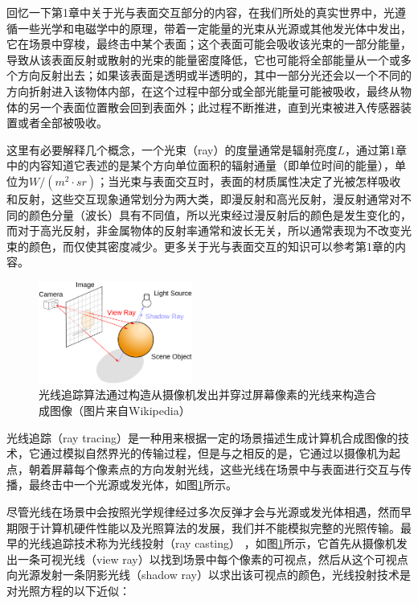 回忆一下第1章中关于光与表面交互部分的内容，在我们所处的真实世界中，光遵循一些光学和电磁学中的原理，带着一定能量的光束从光源或其他发光体中发出，它在场景中穿梭，最终击中某个表面；这个表面可能会吸收该光束的一部分能量，导致从该表面反射或散射的光束的能量密度降低，它也可能将全部能量从一个或多个方向反射出去；如果该表面是透明或半透明的，其中一部分光还会以一个不同的方向折射进入该物体内部，在这个过程中部分或全部光能量可能被吸收，最终从物体的另一个表面位置散会回到表面外；此过程不断推进，直到光束被进入传感器装置或者全部被吸收。

这里有必要解释几个概念，一个光束（ray）的度量通常是辐射亮度$L$，通过第1章中的内容知道它表述的是某个方向单位面积的辐射通量（即单位时间的能量），单位为$W/(m^2\cdot sr)$；当光束与表面交互时，表面的材质属性决定了光被怎样吸收和反射，这些交互现象通常划分为两大类，即漫反射和高光反射，漫反射通常对不同的颜色分量（波长）具有不同值，所以光束经过漫反射后的颜色是发生变化的，而对于高光反射，非金属物体的反射率通常和波长无关，所以通常表现为不改变光束的颜色，而仅使其密度减少。更多关于光与表面交互的知识可以参考第1章的内容。

\begin{figure}
\sidecaption
	\includegraphics[width=0.45\textwidth]{figures/pt/path-1}
	\caption{光线追踪算法通过构造从摄像机发出并穿过屏幕像素的光线来构造合成图像（图片来自Wikipedia）}
	\label{f:pt-ray-tracing}
\end{figure}

光线追踪（ray tracing）是一种用来根据一定的场景描述生成计算机合成图像的技术，它通过模拟自然界光的传输过程，但是与之相反的是，它通过以摄像机为起点，朝着屏幕每个像素点的方向发射光线，这些光线在场景中与表面进行交互与传播，最终击中一个光源或发光体，如图\ref{f:pt-ray-tracing}所示。

尽管光线在场景中会按照光学规律经过多次反弹才会与光源或发光体相遇，然而早期限于计算机硬件性能以及光照算法的发展，我们并不能模拟完整的光照传输。最早的光线追踪技术称为光线投射（ray casting） \cite{a:Sometechniquesforshadingmachinerenderingsofsolids}，如图\ref{f:pt-ray-tracing}所示，它首先从摄像机发出一条可视光线（view ray）以找到场景中每个像素的可视点，然后从这个可视点向光源发射一条阴影光线（shadow ray）以求出该可视点的颜色，光线投射技术是对光照方程的以下近似：

